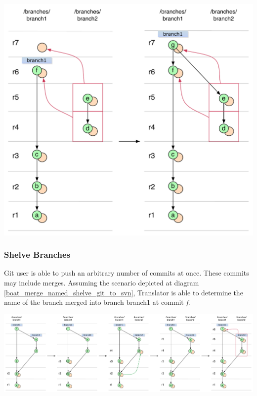 \begin{center}
\includegraphics[width=\textwidth]{img/diagrams/merge_commit_on_double_cherry_pick_branch_no_parent_svn_to_git.pdf}%
\label{merge_commit_on_double_cherry_pick_branch_no_parent_svn_to_git}%
\end{center}

\subsubsection{Shelve Branches}

Git user is able to push an arbitrary number of commits at once. These commits may include merges. Assuming the scenario depicted at diagram \ref{boat_merge_named_shelve_git_to_svn}, Translator is able to determine the name of the branch merged into branch branch1 at commit \emph{f}.

\begin{center}
\includegraphics[width=\textwidth]{img/diagrams/boat_merge_named_shelve_git_to_svn.pdf}%
\label{boat_merge_named_shelve_git_to_svn}%
\end{center}

